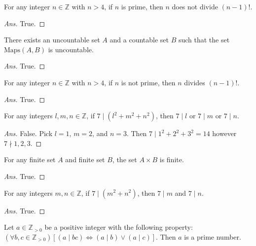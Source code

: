\documentclass[12pt]{article}
\newenvironment{problem}[2][Problem]{\begin{trivlist}
\item[\hskip \labelsep {\bfseries #1}\hskip \labelsep {\bfseries #2.}]}{\end{trivlist}}
\begin{document}
\begin{problem}{40}
For any integer $n \in \mathbb{Z}$ with $n > 4$, if $n$ is prime, then $n$ does not divide $(n-1)!$.
\end{problem}

\begin{proof}[Ans]
True.
\end{proof}

\begin{problem}{41}
There exists an uncountable set $A$ and a countable set $B$ such that the set $\text{Maps}(A, B)$ is uncountable. 
\end{problem}

\begin{proof}[Ans]
True.
\end{proof}

\begin{problem}{42}
For any integer $n \in \mathbb{Z}$ with $ n>4$, if $n$ is not prime, then $n$ divides $(n-1)!$.
\end{problem}

\begin{proof}[Ans]
True.
\end{proof}

\begin{problem}{43}
For any integers $l, m, n \in \mathbb{Z}$, if $7 \mid (l^2 + m^2 + n^2)$, then $7 \mid l$ or $7 \mid m$ or $7 \mid n$.
\end{problem}

\begin{proof}[Ans]
False. Pick $l = 1$, $m = 2$, and $n = 3$. Then $7 \mid 1^2 + 2^2 + 3^2 = 14$ however $7 \nmid 1, 2, 3$.
\end{proof}

\begin{problem}{44}
For any finite set $A$ and finite set $B$, the set $A \times B$ is finite.
\end{problem}

\begin{proof}[Ans]
True.
\end{proof}

\begin{problem}{45}
For any integers $m, n \in \mathbb{Z}$, if $7 \mid (m^2 + n^2)$, then $7 \mid m$ and $7 \mid n$.
\end{problem}

\begin{proof}[Ans]
True.
\end{proof}

\begin{problem}{46}
Let $a \in \mathbb{Z}_{>0}$ be a positive integer with the following property: \newline $(\forall b, c \in \mathbb{Z}_{>0}) \left[ (a \mid bc) \Leftrightarrow (a \mid b) \lor (a \mid c) \right]$. Then $a$ is a prime number. \end{problem}
\end{document}
